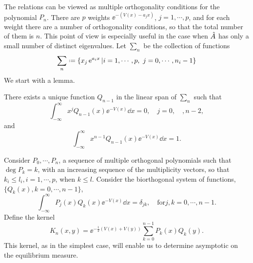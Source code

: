 The relations can be viewed as multiple orthogonality conditions for the polynomial $P_n$. There are $p$ weights $\ee^{-(V (x)-a_jx)}$, $j = 1, \cdots , p$, and for each weight there are a number of orthogonality conditions, so that the total number of them is $n$. This point of view is especially useful in the case when $\hat A$ has only a small number of distinct eigenvalues. Let $\sum_n$ be the collection of functions 
\begin{equation}
	\sum_n \deff \{ x_j \ee^{a_i x} | i = 1, \cdots , p, \ j = 0, \cdots , n_i - 1 \}
\end{equation}
We start with a lemma.
\begin{lemma}
	There exists a unique function $Q_{n-1}$ in the linear span of $\sum_n$ such that
	\begin{equation}
		\int_{-\infty}^{\infty} x^j Q_{n-1}(x) \ee^{-V(x)} \dd x = 0, \quad j = 0, \quad , n-2,
	\end{equation}
	and 
	\begin{equation}
		\int_{-\infty}^{\infty} x^{n-1} Q_{n-1}(x) \ee^{-V(x)} \dd x = 1. 
	\end{equation}
\end{lemma}
Consider $P_0, \cdots, P_n$, a sequence of multiple orthogonal polynomials such that $\deg P_k = k$, with an increasing sequence of the multiplicity vectors, so that $k_i \leq l_i, i = 1, \cdots , p$, when $k \leq l$. Consider the biorthogonal system of functions, $\{ Q_k(x), k = 0, \cdots , n-1\}$, 
\begin{equation}
	\int_{-\infty}^{\infty} P_j(x) Q_k(x) \ee^{-V(x)} \dd x = \delta_{jk}, \quad \text{for} j, k = 0, \cdots , n-1. 
\end{equation}
Define the kernel 
\begin{equation}
	K_n(x, y) = \ee^{-\frac{1}{2}(V(x)+V(y))}  \sum^{n-1}_{k=0} P_k(x)Q_k(y). 
\end{equation}
This kernel, as in the simplest case, will enable us to determine asymptotic on the equilibrium measure.
